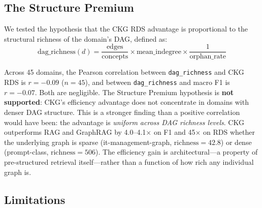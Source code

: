\subsection{The Structure Premium}\label{sec:disc-premium}

We tested the hypothesis that the CKG RDS advantage is proportional to the
structural richness of the domain's DAG, defined as:
\begin{equation}
  \text{dag\_richness}(d) = \frac{\text{edges}}{\text{concepts}} \times
    \text{mean\_indegree} \times \frac{1}{\text{orphan\_rate}}
\end{equation}

Across 45 domains, the Pearson correlation between \texttt{dag\_richness} and
CKG RDS is $r = -0.09$ ($n = 45$), and between \texttt{dag\_richness} and
macro F1 is $r = -0.07$. Both are negligible. The Structure Premium hypothesis
is \textbf{not supported}: CKG's efficiency advantage does not concentrate in
domains with denser DAG structure. This is a stronger finding than a positive
correlation would have been: the advantage is \emph{uniform across DAG richness
levels}. CKG outperforms RAG and GraphRAG by 4.0--4.1$\times$ on F1 and
45$\times$ on RDS whether the underlying graph is sparse (it-management-graph,
$\text{richness} = 42.8$) or dense (prompt-class, $\text{richness} = 506$).
The efficiency gain is architectural---a property of pre-structured retrieval
itself---rather than a function of how rich any individual graph is.

\subsection{Limitations}\label{sec:disc-limitations}

